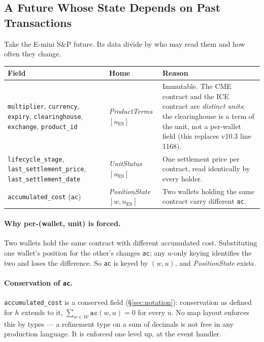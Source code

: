 \documentclass[11pt,a4paper]{article}
\begin{document}
\subsection{A Future Whose State Depends on Past Transactions}
\label{sec:future}

Take the E-mini S\&P future. Its data divide by who may read them and how often they change.

\begin{longtable}{p{4.8cm}p{3.4cm}p{6.2cm}}
\toprule
\textbf{Field} & \textbf{Home} & \textbf{Reason} \\
\midrule
\texttt{multiplier}, \texttt{currency}, \texttt{expiry}, \texttt{clearinghouse},
\texttt{exchange}, \texttt{product\_id} & \emph{ProductTerms}$[u_{\mathrm{ES}}]$ &
Immutable. The CME contract and the ICE contract are \emph{distinct units}; the
clearinghouse is a term of the unit, not a per-wallet field (this replaces v10.3 line
1168). \\
\addlinespace
\texttt{lifecycle\_stage}, \texttt{last\_settlement\_price},
\texttt{last\_settlement\_date} & \emph{UnitStatus}$[u_{\mathrm{ES}}]$ & One settlement
price per contract, read identically by every holder. \\
\addlinespace
\texttt{accumulated\_cost} (\texttt{ac}) & \emph{PositionState}$[w,u_{\mathrm{ES}}]$ & Two
wallets holding the same contract carry different \texttt{ac}. \\
\bottomrule
\end{longtable}

\paragraph{Why per-(wallet, unit) is forced.}
Two wallets hold the same contract with different accumulated cost. Substituting one
wallet's position for the other's changes \texttt{ac}; any $u$-only keying identifies the
two and loses the difference. So \texttt{ac} is keyed by $(w,u)$, and \emph{PositionState}
exists.

\paragraph{Conservation of \texttt{ac}.}
\texttt{accumulated\_cost} is a conserved field (\S\ref{sec:notation}): conservation as
defined for $h$ extends to it, $\sum_{w\in\mathcal{W}}\texttt{ac}(w,u)=0$ for every $u$. No
map layout enforces this by types --- a refinement type on a sum of decimals is not free in
any production language. It is enforced one level up, at the event handler.
\end{document}
